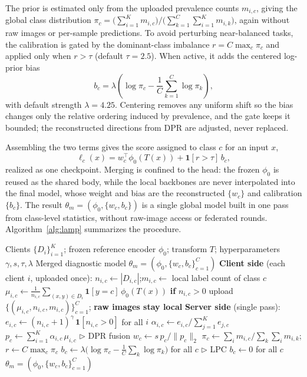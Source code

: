 \documentclass[letterpaper]{article} %
\begin{document}
The prior is estimated only from the uploaded prevalence counts $m_{i,c}$, giving the global class distribution $\pi_c=\big(\sum_{i=1}^{K}m_{i,c}\big)/\big(\sum_{k=1}^{C}\sum_{i=1}^{K}m_{i,k}\big)$, again without raw images or per-sample predictions. To avoid perturbing near-balanced tasks, the calibration is gated by the dominant-class imbalance $r=C\max_c\pi_c$ and applied only when $r>\tau$ (default $\tau=2.5$). When active, it adds the centered log-prior bias
\begin{equation}
b_c=\lambda\left(\log\pi_c-\frac{1}{C}\sum_{k=1}^{C}\log\pi_k\right),
\end{equation}
with default strength $\lambda=4.25$. Centering removes any uniform shift so the bias changes only the relative ordering induced by prevalence, and the gate keeps it bounded; the reconstructed directions from DPR are adjusted, never replaced.

Assembling the two terms gives the score assigned to class $c$ for an input $x$,
\begin{equation}
\ell_c(x)=w_c^{\top}\phi_0(T(x))+\mathbf{1}[r>\tau]\,b_c,
\label{eq:score}
\end{equation}
realized as one checkpoint. Merging is confined to the head: the frozen $\phi_0$ is reused as the shared body, while the local backbones are never interpolated into the final model, whose weight and bias are the reconstructed $\{w_c\}$ and calibration $\{b_c\}$. The result $\theta_m=(\phi_0,\{w_c,b_c\})$ is a single global model built in one pass from class-level statistics, without raw-image access or federated rounds. Algorithm~\ref{alg:lamp} summarizes the procedure.

\begin{algorithm}[!t]
\caption{LAMP-Merge}
\label{alg:lamp}
\begin{algorithmic}[1]
\REQUIRE Clients $\{D_i\}_{i=1}^{K}$; frozen reference encoder $\phi_0$; transform $T$; hyperparameters $\gamma,s,\tau,\lambda$
\ENSURE Merged diagnostic model $\theta_m=(\phi_0,\{w_c,b_c\}_{c=1}^{C})$
\STATE \textbf{Client side} (each client $i$, uploaded once):
    \STATE $n_{i,c}\leftarrow |D_{i,c}|$;\quad $m_{i,c}\leftarrow$ local label count of class $c$
    \STATE $\mu_{i,c}\leftarrow \frac{1}{n_{i,c}}\sum_{(x,y)\in D_i}\mathbf{1}[y=c]\,\phi_0(T(x))$ \quad\textbf{if } $n_{i,c}>0$
\ENDFOR
\STATE upload $\{(\mu_{i,c},n_{i,c},m_{i,c})\}_{c=1}^{C}$; \textbf{raw images stay local}
\STATE \textbf{Server side} (single pass):
    \STATE $e_{i,c}\leftarrow (n_{i,c}+1)^{\gamma}\,\mathbf{1}[n_{i,c}>0]$ for all $i$
    \STATE $\alpha_{i,c}\leftarrow e_{i,c}\big/\sum_{j=1}^{K} e_{j,c}$
    \STATE $p_c\leftarrow \sum_{i=1}^{K}\alpha_{i,c}\,\mu_{i,c}$ \hfill $\triangleright$ DPR fusion
    \STATE $w_c\leftarrow s\,p_c/\|p_c\|_2$
\ENDFOR
\STATE $\pi_c\leftarrow \sum_{i} m_{i,c}\big/\sum_{k}\sum_{i} m_{i,k}$;\quad $r\leftarrow C\max_c \pi_c$
    \STATE $b_c\leftarrow \lambda\big(\log\pi_c-\frac{1}{C}\sum_{k}\log\pi_k\big)$ for all $c$ \hfill $\triangleright$ LPC
\ELSE
    \STATE $b_c\leftarrow 0$ for all $c$
\ENDIF
\RETURN $\theta_m=(\phi_0,\{w_c,b_c\}_{c=1}^{C})$
\end{algorithmic}
\end{algorithm}
\end{document}
